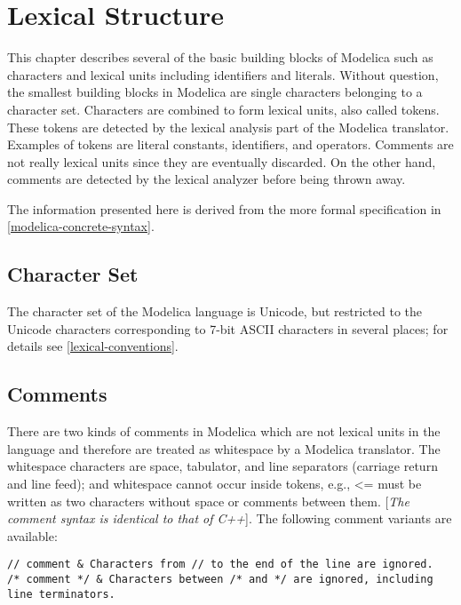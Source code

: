 \chapter{Lexical Structure}

This chapter describes several of the basic building blocks of Modelica
such as characters and lexical units including identifiers and literals.
Without question, the smallest building blocks in Modelica are single
characters belonging to a character set. Characters are combined to form
lexical units, also called tokens. These tokens are detected by the
lexical analysis part of the Modelica translator. Examples of tokens are
literal constants, identifiers, and operators. Comments are not really
lexical units since they are eventually discarded. On the other hand,
comments are detected by the lexical analyzer before being thrown away.

The information presented here is derived from the more formal
specification in \autoref{modelica-concrete-syntax}.

\section{Character Set}

The character set of the Modelica language is Unicode, but restricted to
the Unicode characters corresponding to 7-bit ASCII characters in
several places; for details see \autoref{lexical-conventions}.

\section{Comments}

There are two kinds of comments in Modelica which are not lexical units
in the language and therefore are treated as whitespace by a Modelica
translator. The whitespace characters are space, tabulator, and line
separators (carriage return and line feed); and whitespace cannot occur
inside tokens, e.g., \textless{}= must be written as two characters
without space or comments between them. {[}\emph{The comment syntax is
identical to that of C++}{]}. The following comment variants are
available:

\begin{lstlisting}[language=modelica]
// comment & Characters from // to the end of the line are ignored.
/* comment */ & Characters between /* and */ are ignored, including line terminators.
\end{lstlisting}

